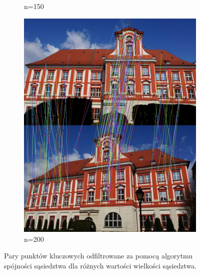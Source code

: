 \documentclass{article}
\begin{document}
\begin{figure}[H]
\begin{subfigure}[b]{0.4\linewidth}
			\caption{n=150}
		\end{subfigure}
		\begin{subfigure}[b]{0.4\linewidth}
			\includegraphics[width=\linewidth]{s200.png}
			\caption{n=200}
		\end{subfigure}
		\caption{Pary punktów kluczowych odfiltrowane za pomocą algorytmu spójności sąsiedztwa dla różnych wartości wielkości sąsiedztwa.}
		\label{fig:nsize}
	\end{figure}
\end{document}
